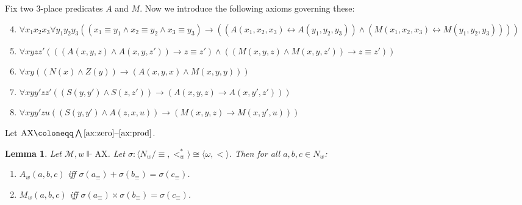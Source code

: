 \documentclass[12pt]{article}
\newtheorem{lemma}{Lemma}
\newcommand{\tup}[1]{\langle #1 \rangle}
\newcommand{\then}{\mathbin{\rightarrow}}
\renewcommand{\iff}{\mathbin{\leftrightarrow}}
\newcommand{\Ax}{\text{AX}}
\begin{document}
Fix two 3-place predicates $A$ and $M$. 
Now we introduce the following axioms governing these:
\begin{enumerate}[label=(Ax\arabic*)]
\setcounter{enumi}{3}
    \item $\forall x_1x_2x_3\forall y_1y_2y_3((x_1 \equiv y_1 \wedge x_2 \equiv y_2 \wedge x_3 \equiv y_3) \then ((A(x_1,x_2,x_3) \iff A(y_1,y_2,y_3)) \wedge (M(x_1,x_2,x_3) \iff M(y_1,y_2,y_3))))$\label{ax:cong}
    \item $\forall xyzz'(((A(x,y,z) \wedge A(x,y,z')) \then z \equiv z') \wedge ((M(x,y,z) \wedge M(x,y,z')) \then z \equiv z'))$\label{ax:func}
    \item $\forall xy((N(x) \wedge Z(y)) \then (A(x,y,x) \wedge M(x,y,y)))$\label{ax:unit}
    \item $\forall xyy'zz'((S(y,y') \wedge S(z,z')) \then (A(x,y,z) \then A(x,y',z')))$\label{ax:add}
    \item $\forall xyy'zu((S(y,y') \wedge A(z,x,u)) \then (M(x,y,z) \then M(x,y',u)))$\label{ax:prod}
\end{enumerate}
Let $\Ax \coloneqq \bigwedge \text{\ref{ax:zero}--\ref{ax:prod}}$. 

\begin{lemma}
    Let $\mathcal{M},w \Vdash \Ax$. 
    Let $\sigma\colon \tup{N_w/\equiv,<_w^*} \cong \tup{\omega,<}$. 
    Then for all $a,b,c \in N_w$:
    \begin{enumerate}
        \item $A_w(a,b,c)$ iff $\sigma(a_\equiv) + \sigma(b_\equiv) = \sigma(c_\equiv)$.
        \item $M_w(a,b,c)$ iff $\sigma(a_\equiv) \times \sigma(b_\equiv) = \sigma(c_\equiv)$.
    \end{enumerate}
\end{lemma}
\end{document}
